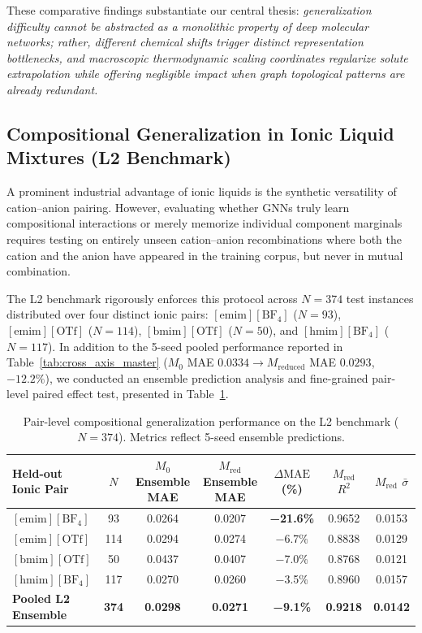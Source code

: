 These comparative findings substantiate our central thesis: \textit{generalization difficulty cannot be abstracted as a monolithic property of deep molecular networks; rather, different chemical shifts trigger distinct representation bottlenecks, and macroscopic thermodynamic scaling coordinates regularize solute extrapolation while offering negligible impact when graph topological patterns are already redundant.}

\subsection{Compositional Generalization in Ionic Liquid Mixtures (L2 Benchmark)}
\label{subsec:l2_benchmark}

A prominent industrial advantage of ionic liquids is the synthetic versatility of cation--anion pairing. However, evaluating whether GNNs truly learn compositional interactions or merely memorize individual component marginals requires testing on entirely unseen cation--anion recombinations where both the cation and the anion have appeared in the training corpus, but never in mutual combination.

The L2 benchmark rigorously enforces this protocol across $N=374$ test instances distributed over four distinct ionic pairs: $[\text{emim}][\text{BF}_4]$ ($N=93$), $[\text{emim}][\text{OTf}]$ ($N=114$), $[\text{bmim}][\text{OTf}]$ ($N=50$), and $[\text{hmim}][\text{BF}_4]$ ($N=117$). In addition to the 5-seed pooled performance reported in Table~\ref{tab:cross_axis_master} ($M_0$ MAE $0.0334 \to M_{\mathrm{reduced}}$ MAE $0.0293$, $-12.2\%$), we conducted an ensemble prediction analysis and fine-grained pair-level paired effect test, presented in Table~\ref{tab:l2_pairs}.

\begin{table}[htbp]
\centering
\small
\caption{Pair-level compositional generalization performance on the L2 benchmark ($N=374$). Metrics reflect 5-seed ensemble predictions.}
\label{tab:l2_pairs}
\begin{tabular}{lcccccc}
\toprule
\textbf{Held-out Ionic Pair} & \textbf{$N$} & \textbf{$M_0$ Ensemble MAE} & \textbf{$M_{\mathrm{red}}$ Ensemble MAE} & \textbf{$\Delta\text{MAE}$ (\%)} & \textbf{$M_{\mathrm{red}}$ $R^2$} & \textbf{$M_{\mathrm{red}}$ $\bar{\sigma}$} \\
\midrule
$[\text{emim}][\text{BF}_4]$ & 93 & 0.0264 & 0.0207 & \textbf{−21.6\%} & 0.9652 & 0.0153 \\
$[\text{emim}][\text{OTf}]$ & 114 & 0.0294 & 0.0274 & −6.7\% & 0.8838 & 0.0129 \\
$[\text{bmim}][\text{OTf}]$ & 50 & 0.0437 & 0.0407 & −7.0\% & 0.8768 & 0.0121 \\
$[\text{hmim}][\text{BF}_4]$ & 117 & 0.0270 & 0.0260 & −3.5\% & 0.8960 & 0.0157 \\
\midrule
\textbf{Pooled L2 Ensemble} & \textbf{374} & \textbf{0.0298} & \textbf{0.0271} & \textbf{−9.1\%} & \textbf{0.9218} & \textbf{0.0142} \\
\bottomrule
\end{tabular}
\end{table}

